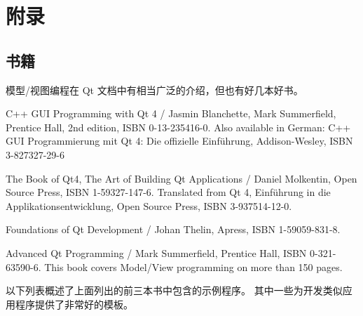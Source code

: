 \section{附录}
\subsection{书籍}

模型/视图编程在 Qt 文档中有相当广泛的介绍，但也有好几本好书。

\begin{compactitem}
\item C++ GUI Programming with Qt 4 / Jasmin Blanchette, Mark Summerfield, Prentice Hall, 2nd edition, ISBN 0-13-235416-0. 
      Also available in German: C++ GUI Programmierung mit Qt 4: Die offizielle Einführung, Addison-Wesley, ISBN 3-827327-29-6
\item The Book of Qt4, The Art of Building Qt Applications / Daniel Molkentin, Open Source Press, ISBN 1-59327-147-6. 
      Translated from Qt 4, Einführung in die Applikationsentwicklung, Open Source Press, ISBN 3-937514-12-0.
\item Foundations of Qt Development / Johan Thelin, Apress, ISBN 1-59059-831-8.
\item Advanced Qt Programming / Mark Summerfield, Prentice Hall, ISBN 0-321-63590-6. 
      This book covers Model/View programming on more than 150 pages.
\end{compactitem}

以下列表概述了上面列出的前三本书中包含的示例程序。
其中一些为开发类似应用程序提供了非常好的模板。

